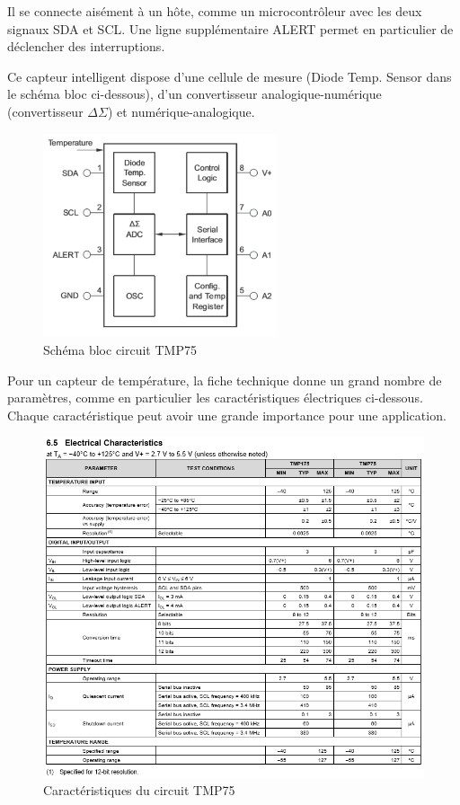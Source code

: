 Il se connecte aisément à un hôte, comme un microcontrôleur avec les deux signaux SDA et SCL. Une ligne supplémentaire ALERT permet en particulier de déclencher des interruptions.

Ce capteur intelligent dispose d'une cellule de mesure (Diode Temp. Sensor dans le schéma bloc ci-dessous), d'un convertisseur analogique-numérique (convertisseur $ \Delta \Sigma$) et numérique-analogique.


\begin{figure}[h!]
\centering
\includegraphics[height=6cm]{assets/figures/4_2_2_Temperature_TMP75_schema_bloc.PNG}
\caption{Schéma bloc circuit TMP75}
\label{fig:Temperature_TMP75_schema_bloc}
\end{figure}

Pour un capteur de température, la fiche technique donne un grand nombre de paramètres, comme en particulier les caractéristiques électriques ci-dessous. Chaque caractéristique peut avoir une grande importance pour une application.

\begin{figure}[h!]
\centering
\includegraphics[width=15cm]{assets/figures/4_2_2_Temperature_TMP75_caracteristiques.PNG}
\caption{Caractéristiques du circuit TMP75}
\label{fig:Temperature_TMP75_caracteristiques}
\end{figure}



